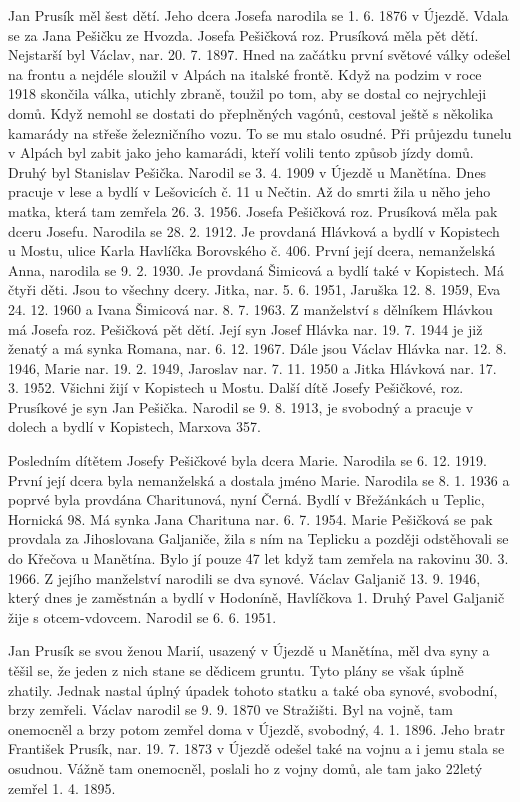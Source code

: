 \documentclass[../dejiny-rodu-prusiku.tex]{subfiles}
\begin{document}
Jan Prusík měl šest dětí. Jeho dcera Josefa narodila se 1. 6. 1876 v Újezdě. Vdala se za Jana Pešičku ze Hvozda. Josefa Pešičková roz. Prusíková měla pět dětí. Nejstarší byl Václav, nar. 20. 7. 1897. Hned na začátku první světové války odešel na frontu a nejdéle sloužil v Alpách na italské frontě. Když na podzim v roce 1918 skončila válka, utichly zbraně, toužil po tom, aby se dostal co nejrychleji domů. Když nemohl se dostati do přeplněných vagónů, cestoval ještě s několika kamará­dy na střeše železničního vozu. To se mu stalo osudné. Při průjezdu tunelu v Alpách byl zabit jako jeho kama­rádi, kteří volili tento způsob jízdy domů. Druhý byl Stanislav Pešička. Narodil se 3. 4. 1909 v Újezdě u Manětína. Dnes pracuje v lese a bydlí v Lešovicích č. 11 u Nečtin. Až do smrti žila u něho jeho matka, kte­rá tam zemřela 26. 3. 1956. Josefa Pešičková roz. Prusíková měla pak dceru Josefu. Narodila se 28. 2. 1912. Je pro­vdaná Hlávková a bydlí v Kopistech u Mostu, ulice Karla Havlíčka Borovského č. 406. První její dcera, nemanžel­ská Anna, narodila se 9. 2. 1930. Je provdaná Šimicová a bydlí také v Kopistech. Má čtyři děti. Jsou to všechny dcery. Jitka, nar. 5. 6. 1951, Jaruška 12. 8. 1959, Eva 24. 12. 1960 a Ivana Šimicová nar. 8. 7. 1963. Z manželství s dělníkem Hlávkou má Josefa roz. Pešičková pět dětí. Její syn Josef Hlávka nar. 19. 7. 1944 je již ženatý a má synka Romana, nar. 6. 12. 1967. Dále jsou Václav Hlávka nar. 12. 8. 1946, Marie nar. 19. 2. 1949, Jaroslav nar. 7. 11. 1950 a Jitka Hlávková nar. 17. 3. 1952. Všichni žijí v Kopistech u Mostu. Další dítě Josefy Pešičkové, roz. Prusíkové je syn Jan Pešička. Narodil se 9. 8. 1913, je svobodný a pracuje v dolech a bydlí v Kopistech, Marxova 357.

Posledním dítětem Josefy Pešičkové byla dcera Marie. Narodila se 6. 12. 1919. První její dcera byla nemanželská a dostala jméno Marie. Narodila se 8. 1. 1936 a poprvé byla provdána Charitunová, nyní Černá. Bydlí v Břežánkách u Teplic, Hornická 98. Má synka Jana Charituna nar. 6. 7. 1954. Marie Pešičková se pak provda­la za Jihoslovana Galjaniče, žila s ním na Teplicku a později odstěhovali se do Křečova u Manětína. Bylo jí pouze 47 let když tam zemřela na rakovinu 30. 3. 1966. Z jejího manželství narodili se dva synové.  Václav Galjanič 13. 9. 1946, který dnes je zaměstnán a bydlí v Hodoníně, Havlíčkova 1. Druhý Pavel Galjanič žije s otcem-vdovcem. Narodil se 6. 6. 1951.

Jan Prusík se svou ženou Marií, usazený v Újezdě u Manětína, měl dva syny a těšil se, že jeden z nich stane se dědicem gruntu. Tyto plány se však úplně zhatily. Jednak nastal úplný úpadek tohoto statku a ta­ké oba synové, svobodní, brzy zemřeli. Václav na­rodil se 9. 9. 1870 ve Stražišti. Byl na vojně, tam onemocněl a brzy potom zemřel doma v Újezdě, svobod­ný, 4. 1. 1896. Jeho bratr František Prusík, nar. 19. 7. 1873 v Újezdě odešel také na vojnu a i jemu stala se osudnou. Vážně tam onemocněl, poslali ho z vojny domů, ale tam jako 22letý zemřel 1. 4. 1895.
\end{document}
